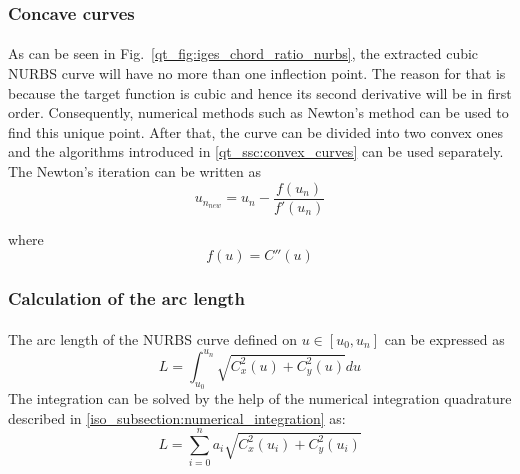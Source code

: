 \subsubsection{Concave curves}
\paragraph{}
As can be seen in Fig.~\ref{qt_fig:iges_chord_ratio_nurbs}, the extracted cubic NURBS curve will have no more than one inflection point.
The reason for that is because the target function is cubic and hence its second derivative will be in first order.
Consequently, numerical methods such as Newton's method can be used to find this unique point.
After that, the curve can be divided into two convex ones and the algorithms introduced in \ref{qt_ssc:convex_curves} can be used separately.
The Newton's iteration can be written as
    \begin{equation}
        u_{n_{new}} = u_n - \frac{f(u_n)}{f'(u_n)}
    \end{equation}

where
    \begin{equation}
        f(u) = C''(u)
    \end{equation}
%
\subsubsection{Calculation of the arc length}
\paragraph{}
The arc length of the NURBS curve defined on $u \in [u_0, u_n]$ can be expressed as
    \begin{equation}
        L = \int_{u_0} ^{u_n} \sqrt{C_x^2(u) + C_y^2(u)} du
    \end{equation}
%
The integration can be solved by the help of the numerical integration quadrature described in \ref{iso_subsection:numerical_integration} as:
    \begin{equation}
        L = \sum_{i=0}^n a_i \sqrt{C_x^2(u_i) + C_y^2(u_i)}
    \end{equation}

